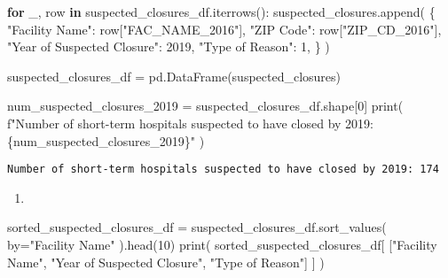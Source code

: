 \documentclass[
  letterpaper,
  DIV=11,
  numbers=noendperiod]{scrartcl}
\newenvironment{Shaded}{\begin{snugshade}}{\end{snugshade}}
\newcommand{\BuiltInTok}[1]{\textcolor[rgb]{0.00,0.23,0.31}{#1}}
\newcommand{\ControlFlowTok}[1]{\textcolor[rgb]{0.00,0.23,0.31}{\textbf{#1}}}
\newcommand{\DecValTok}[1]{\textcolor[rgb]{0.68,0.00,0.00}{#1}}
\newcommand{\KeywordTok}[1]{\textcolor[rgb]{0.00,0.23,0.31}{\textbf{#1}}}
\newcommand{\NormalTok}[1]{\textcolor[rgb]{0.00,0.23,0.31}{#1}}
\newcommand{\OperatorTok}[1]{\textcolor[rgb]{0.37,0.37,0.37}{#1}}
\newcommand{\SpecialCharTok}[1]{\textcolor[rgb]{0.37,0.37,0.37}{#1}}
\newcommand{\SpecialStringTok}[1]{\textcolor[rgb]{0.13,0.47,0.30}{#1}}
\newcommand{\StringTok}[1]{\textcolor[rgb]{0.13,0.47,0.30}{#1}}
\providecommand{\tightlist}{%
  \setlength{\itemsep}{0pt}\setlength{\parskip}{0pt}}\usepackage{longtable,booktabs,array}
\begin{document}
\begin{Shaded}
\begin{Highlighting}[]
\ControlFlowTok{for}\NormalTok{ \_, row }\KeywordTok{in}\NormalTok{ suspected\_closures\_df.iterrows():}
\NormalTok{    suspected\_closures.append(}
\NormalTok{        \{}
            \StringTok{"Facility Name"}\NormalTok{: row[}\StringTok{"FAC\_NAME\_2016"}\NormalTok{],}
            \StringTok{"ZIP Code"}\NormalTok{: row[}\StringTok{"ZIP\_CD\_2016"}\NormalTok{],}
            \StringTok{"Year of Suspected Closure"}\NormalTok{: }\DecValTok{2019}\NormalTok{,}
            \StringTok{"Type of Reason"}\NormalTok{: }\DecValTok{1}\NormalTok{,}
\NormalTok{        \}}
\NormalTok{    )}

\NormalTok{suspected\_closures\_df }\OperatorTok{=}\NormalTok{ pd.DataFrame(suspected\_closures)}

\NormalTok{num\_suspected\_closures\_2019 }\OperatorTok{=}\NormalTok{ suspected\_closures\_df.shape[}\DecValTok{0}\NormalTok{]}
\BuiltInTok{print}\NormalTok{(}
    \SpecialStringTok{f"Number of short{-}term hospitals suspected to have closed by 2019: }\SpecialCharTok{\{}\NormalTok{num\_suspected\_closures\_2019}\SpecialCharTok{\}}\SpecialStringTok{"}
\NormalTok{)}
\end{Highlighting}
\end{Shaded}

\begin{verbatim}
Number of short-term hospitals suspected to have closed by 2019: 174
\end{verbatim}

\begin{enumerate}
\def\labelenumi{\arabic{enumi}.}
\setcounter{enumi}{1}
\tightlist
\item
\end{enumerate}

\begin{Shaded}
\begin{Highlighting}[]
\NormalTok{sorted\_suspected\_closures\_df }\OperatorTok{=}\NormalTok{ suspected\_closures\_df.sort\_values(}
\NormalTok{    by}\OperatorTok{=}\StringTok{"Facility Name"}
\NormalTok{).head(}\DecValTok{10}\NormalTok{)}
\BuiltInTok{print}\NormalTok{(}
\NormalTok{    sorted\_suspected\_closures\_df[}
\NormalTok{        [}\StringTok{"Facility Name"}\NormalTok{, }\StringTok{"Year of Suspected Closure"}\NormalTok{, }\StringTok{"Type of Reason"}\NormalTok{]}
\NormalTok{    ]}
\NormalTok{)}
\end{Highlighting}
\end{Shaded}
\end{document}
